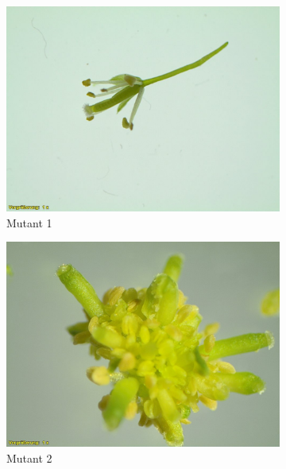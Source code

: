 \documentclass[10pt,a4paper]{article}
\begin{document}
		\begin{figure}[H]
			\centering
			\begin{subfigure}[b]{0.45\textwidth}
				\includegraphics[width=\textwidth]{1_O+A.jpg}
				\caption{Mutant 1}
				\label{fig:M1}
			\end{subfigure}
			\hfill
			\begin{subfigure}[b]{0.45\textwidth}
				\includegraphics[width=\textwidth]{2_O+A(1).jpg}
				\caption{Mutant 2}
				\label{fig:M2}
			\end{subfigure}
			\hfill
			\begin{subfigure}[b]{0.45\textwidth}

\end{subfigure}
\end{figure}
\end{document}
